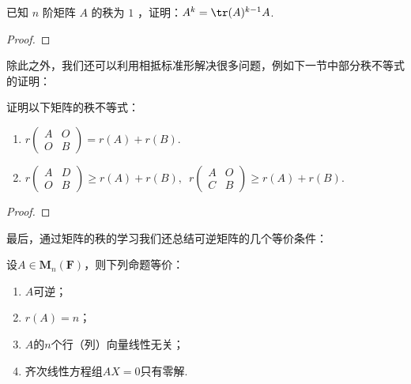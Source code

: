\begin{example}\label{ex:11:相抵分解}
    已知 $n$ 阶矩阵 $A$ 的秩为 $1$ ，证明：$A^k=\tr(A)^{k-1}A$.
\end{example}

\begin{proof}

\end{proof}

除此之外，我们还可以利用相抵标准形解决很多问题，例如下一节中部分秩不等式的证明：
\begin{example}\label{ex:11:分块秩不等式}
    证明以下矩阵的秩不等式：
    \begin{enumerate}
        \item $r\begin{pmatrix}
                      A & O \\ O & B
                  \end{pmatrix}=r(A)+r(B)$.

        \item $r\begin{pmatrix}
                      A & D \\ O & B
                  \end{pmatrix}\geqslant r(A)+r(B),\enspace r\begin{pmatrix}
                      A & O \\ C & B
                  \end{pmatrix}\geqslant r(A)+r(B)$.
    \end{enumerate}
\end{example}

\begin{proof}

\end{proof}

最后，通过矩阵的秩的学习我们还总结可逆矩阵的几个等价条件：
\begin{theorem}\label{thm:11:可逆等价条件}
    设$A \in \mathbf{M}_n(\mathbf{F})$，则下列命题等价：
    \begin{enumerate}[label=(\arabic*)]
        \item \label{item:11:可逆等价条件:1}
              $A$可逆；

        \item \label{item:11:可逆等价条件:2}
              $r(A)=n$；

        \item \label{item:11:可逆等价条件:3}
              $A$的$n$个行（列）向量线性无关；

        \item \label{item:11:可逆等价条件:4}
              齐次线性方程组$AX=0$只有零解.
    \end{enumerate}
\end{theorem}

